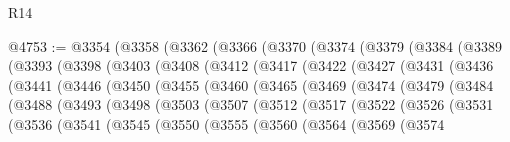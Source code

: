 \begin{lexlean}{R14}
\begin{coremodule}
{{{{{{{{{{{{{{{{{{{{{{{{{{{{{{{{{{{{{{{{{{{{{{{{{{{{{{{{{{{{{{{{{{{{{{{{{{{{{{{{{{@4753 := @3354
    (@3358
      (@3362
        (@3366
          (@3370
            (@3374
              (@3379
                (@3384
                  (@3389
                    (@3393
                      (@3398
                        (@3403
                          (@3408
                            (@3412
                              (@3417
                                (@3422
                                  (@3427
                                    (@3431
                                      (@3436
                                        (@3441
                                          (@3446
                                            (@3450
                                              (@3455
                                                (@3460
                                                  (@3465
                                                    (@3469
                                                      (@3474
                                                        (@3479
                                                          (@3484
                                                            (@3488
                                                              (@3493
                                                                (@3498
                                                                  (@3503
                                                                    (@3507
                                                                      (@3512
                                                                        (@3517
                                                                          (@3522
                                                                            (@3526
                                                                              (@3531
                                                                                (@3536
                                                                                  (@3541
                                                                                    (@3545
                                                                                      (@3550
                                                                                        (@3555
                                                                                          (@3560
                                                                                            (@3564
                                                                                              (@3569
                                                                                                (@3574
}}}}}}}}}}}}}}}}}}}}}}}}}}}}}}}}}}}}}}}}}}}}}}}}}}}}}}}}}}}}}}}}}}}}}}}}}}}}}}}}}}
\end{coremodule}
\end{lexlean}
